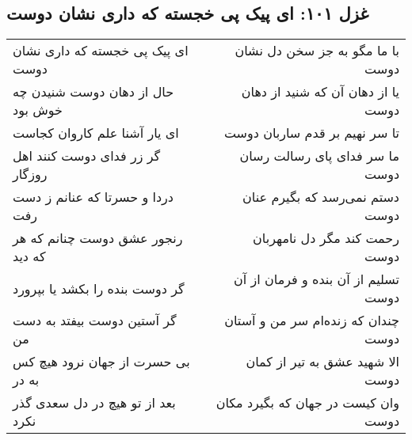\begin{center}
\section*{غزل ۱۰۱: ای پیک پی خجسته که داری نشان دوست}
\label{sec:101}
\begin{longtable}{l p{0.5cm} r}
ای پیک پی خجسته که داری نشان دوست
&&
با ما مگو به جز سخن دل نشان دوست
\\
حال از دهان دوست شنیدن چه خوش بود
&&
یا از دهان آن که شنید از دهان دوست
\\
ای یار آشنا علم کاروان کجاست
&&
تا سر نهیم بر قدم ساربان دوست
\\
گر زر فدای دوست کنند اهل روزگار
&&
ما سر فدای پای رسالت رسان دوست
\\
دردا و حسرتا که عنانم ز دست رفت
&&
دستم نمی‌رسد که بگیرم عنان دوست
\\
رنجور عشق دوست چنانم که هر که دید
&&
رحمت کند مگر دل نامهربان دوست
\\
گر دوست بنده را بکشد یا بپرورد
&&
تسلیم از آن بنده و فرمان از آن دوست
\\
گر آستین دوست بیفتد به دست من
&&
چندان که زنده‌ام سر من و آستان دوست
\\
بی حسرت از جهان نرود هیچ کس به در
&&
الا شهید عشق به تیر از کمان دوست
\\
بعد از تو هیچ در دل سعدی گذر نکرد
&&
وان کیست در جهان که بگیرد مکان دوست
\\
\end{longtable}
\end{center}
